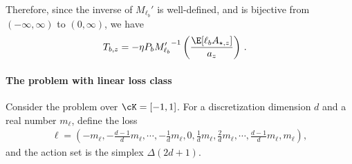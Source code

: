 Therefore, since the inverse of $M_{\ell_b}'$ is well-defined,
and is bijective from $(-\infty, \infty)$ to $(0, \infty)$,
we have
\begin{align*}
    T_{b, z}
     & =
    - \eta P_b
    {M_{\ell_b}'}^{-1}\left(
    \frac{\E\!\left[
        \ell_b A_{\star, z}
        \right]}{a_z}
    \right)\,.
\end{align*}

\clearpage
\paragraph{The problem with linear loss class}
Consider the \olo problem over $\cK = [-1, 1]$.
For a discretization dimension $d$
and a real number $m_\ell$, define the loss
\begin{align*}
    \ell = (-m_\ell, -\tfrac{d-1}{d}m_\ell, \cdots,
    -\tfrac{1}{d}m_\ell, 0, \tfrac{1}{d}m_\ell,
    \tfrac{2}{d}m_\ell, \cdots, \tfrac{d-1}{d} m_\ell, m_\ell),
\end{align*}
and the action set is the simplex $\Delta(2d + 1)$.

